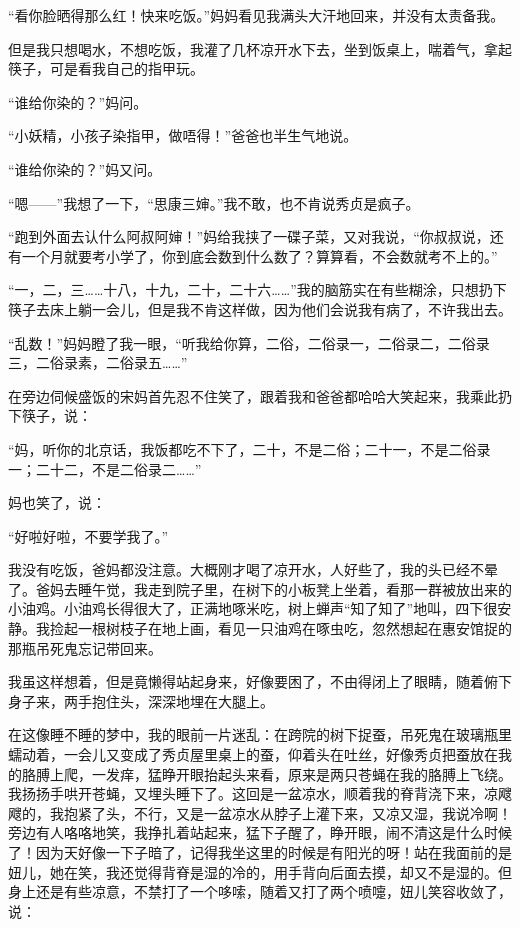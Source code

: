 \par “看你脸晒得那么红！快来吃饭。”妈妈看见我满头大汗地回来，并没有太责备我。
\par 但是我只想喝水，不想吃饭，我灌了几杯凉开水下去，坐到饭桌上，喘着气，拿起筷子，可是看我自己的指甲玩。
\par “谁给你染的？”妈问。
\par “小妖精，小孩子染指甲，做唔得！”爸爸也半生气地说。
\par “谁给你染的？”妈又问。
\par “嗯——”我想了一下，“思康三婶。”我不敢，也不肯说秀贞是疯子。
\par “跑到外面去认什么阿叔阿婶！”妈给我挟了一碟子菜，又对我说，“你叔叔说，还有一个月就要考小学了，你到底会数到什么数了？算算看，不会数就考不上的。”
\par “一，二，三……十八，十九，二十，二十六……”我的脑筋实在有些糊涂，只想扔下筷子去床上躺一会儿，但是我不肯这样做，因为他们会说我有病了，不许我出去。
\par “乱数！”妈妈瞪了我一眼，“听我给你算，二俗，二俗录一，二俗录二，二俗录三，二俗录素，二俗录五……”
\par 在旁边伺候盛饭的宋妈首先忍不住笑了，跟着我和爸爸都哈哈大笑起来，我乘此扔下筷子，说：
\par “妈，听你的北京话，我饭都吃不下了，二十，不是二俗；二十一，不是二俗录一；二十二，不是二俗录二……”
\par 妈也笑了，说：
\par “好啦好啦，不要学我了。”
\par 我没有吃饭，爸妈都没注意。大概刚才喝了凉开水，人好些了，我的头已经不晕了。爸妈去睡午觉，我走到院子里，在树下的小板凳上坐着，看那一群被放出来的小油鸡。小油鸡长得很大了，正满地啄米吃，树上蝉声“知了知了”地叫，四下很安静。我捡起一根树枝子在地上画，看见一只油鸡在啄虫吃，忽然想起在惠安馆捉的那瓶吊死鬼忘记带回来。
\par 我虽这样想着，但是竟懒得站起身来，好像要困了，不由得闭上了眼睛，随着俯下身子来，两手抱住头，深深地埋在大腿上。
\par 在这像睡不睡的梦中，我的眼前一片迷乱：在跨院的树下捉蚕，吊死鬼在玻璃瓶里蠕动着，一会儿又变成了秀贞屋里桌上的蚕，仰着头在吐丝，好像秀贞把蚕放在我的胳膊上爬，一发痒，猛睁开眼抬起头来看，原来是两只苍蝇在我的胳膊上飞绕。我扬扬手哄开苍蝇，又埋头睡下了。这回是一盆凉水，顺着我的脊背浇下来，凉飕飕的，我抱紧了头，不行，又是一盆凉水从脖子上灌下来，又凉又湿，我说冷啊！旁边有人咯咯地笑，我挣扎着站起来，猛下子醒了，睁开眼，闹不清这是什么时候了！因为天好像一下子暗了，记得我坐这里的时候是有阳光的呀！站在我面前的是妞儿，她在笑，我还觉得背脊是湿的冷的，用手背向后面去摸，却又不是湿的。但身上还是有些凉意，不禁打了一个哆嗦，随着又打了两个喷嚏，妞儿笑容收敛了，说：
